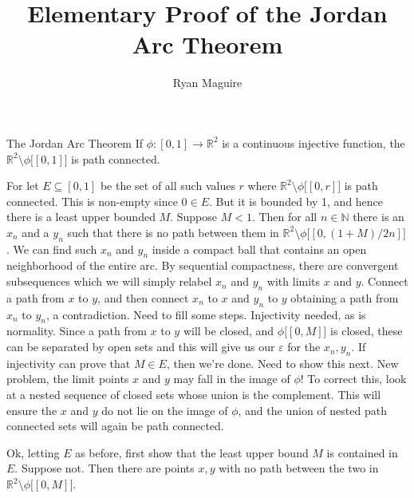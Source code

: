 \documentclass{article}                                                        %
\begin{document}
    \title{Elementary Proof of the Jordan Arc Theorem}
    \author{Ryan Maguire}
    \date{\vspace{-5ex}}
    \maketitle
    \setcounter{section}{1}
    \begin{ftheorem}{The Jordan Arc Theorem}
        If $\phi:[0,1]\rightarrow\mathbb{R}^{2}$ is a continuous injective
        function, the $\mathbb{R}^{2}\setminus\phi\big[[0,1]\big]$ is path
        connected.
    \end{ftheorem}
    \begin{bproof}
        For let $E\subseteq[0,1]$ be the set of all such values $r$ where
        $\mathbb{R}^{2}\setminus\phi\big[[0,r]\big]$ is path connected. This is
        non-empty since $0\in{E}$. But it is bounded by 1, and hence there is a
        least upper bounded $M$. Suppose $M<1$. Then for all $n\in\mathbb{N}$
        there is an $x_{n}$ and a $y_{n}$ such that there is no path between
        them in $\mathbb{R}^{2}\setminus\phi\big[[0,(1+M)/2n]\big]$. We can find
        such $x_{n}$ and $y_{n}$ inside a compact ball that contains an open
        neighborhood of the entire arc. By sequential compactness, there are
        convergent subsequences which we will simply relabel $x_{n}$ and $y_{n}$
        with limits $x$ and $y$. Connect a path from $x$ to $y$, and then
        connect $x_{n}$ to $x$ and $y_{n}$ to $y$ obtaining a path from $x_{n}$
        to $y_{n}$, a contradiction. Need to fill some steps. Injectivity
        needed, as is normality. Since a path from $x$ to $y$ will be closed,
        and $\phi\big[[0,M]\big]$ is closed, these can be separated by open sets
        and this will give us our $\varepsilon$ for the $x_{n},y_{n}$. If
        injectivity can prove that $M\in{E}$, then we're done. Need to show this
        next. New problem, the limit points $x$ and $y$ may fall in the image of
        $\phi$! To correct this, look at a nested sequence of closed sets whose
        union is the complement. This will ensure the $x$ and $y$ do not lie on
        the image of $\phi$, and the union of nested path connected sets will
        again be path connected.
        \par\hfill\par
        Ok, letting $E$ as before, first show that the least upper bound $M$ is
        contained in $E$. Suppose not. Then there are points $x,y$ with no
        path between the two in $\mathbb{R}^{2}\setminus\phi\big[[0,M]\big]$.

\end{bproof}
\end{document}
